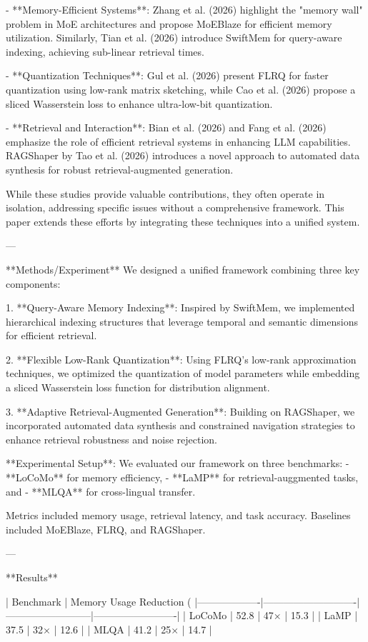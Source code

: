 - **Memory-Efficient Systems**: Zhang et al. (2026) highlight the "memory wall" problem in MoE architectures and propose MoEBlaze for efficient memory utilization. Similarly, Tian et al. (2026) introduce SwiftMem for query-aware indexing, achieving sub-linear retrieval times.
  
- **Quantization Techniques**: Gul et al. (2026) present FLRQ for faster quantization using low-rank matrix sketching, while Cao et al. (2026) propose a sliced Wasserstein loss to enhance ultra-low-bit quantization.

- **Retrieval and Interaction**: Bian et al. (2026) and Fang et al. (2026) emphasize the role of efficient retrieval systems in enhancing LLM capabilities. RAGShaper by Tao et al. (2026) introduces a novel approach to automated data synthesis for robust retrieval-augmented generation.

While these studies provide valuable contributions, they often operate in isolation, addressing specific issues without a comprehensive framework. This paper extends these efforts by integrating these techniques into a unified system.

---

**Methods/Experiment**  
We designed a unified framework combining three key components:

1. **Query-Aware Memory Indexing**: Inspired by SwiftMem, we implemented hierarchical indexing structures that leverage temporal and semantic dimensions for efficient retrieval.

2. **Flexible Low-Rank Quantization**: Using FLRQ's low-rank approximation techniques, we optimized the quantization of model parameters while embedding a sliced Wasserstein loss function for distribution alignment.

3. **Adaptive Retrieval-Augmented Generation**: Building on RAGShaper, we incorporated automated data synthesis and constrained navigation strategies to enhance retrieval robustness and noise rejection.

**Experimental Setup**:  
We evaluated our framework on three benchmarks:
- **LoCoMo** for memory efficiency,
- **LaMP** for retrieval-auggmented tasks, and
- **MLQA** for cross-lingual transfer.

Metrics included memory usage, retrieval latency, and task accuracy. Baselines included MoEBlaze, FLRQ, and RAGShaper.

---

**Results**

| Benchmark        | Memory Usage Reduction (%
|-------------------|----------------------------|--------------------------|-------------------------|
| LoCoMo           | 52.8                       | 47×                     | 15.3                   |
| LaMP             | 37.5                       | 32×                     | 12.6                   |
| MLQA             | 41.2                       | 25×                     | 14.7                   |

